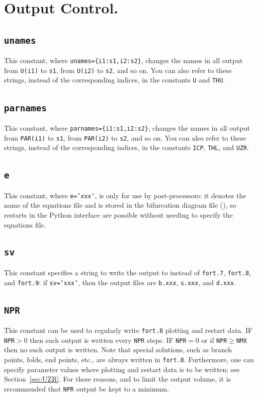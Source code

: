 \documentclass[12pt]{report}
\begin{document}
\section{ Output Control.} \label{sec:Output_control}
\subsection{\tt unames}  \label{sec:unames}
This constant, where {\tt unames=\{i1:s1,i2:s2\}}, changes the names in all
output from {\tt U(i1)} to {\tt s1}, from {\tt U(i2)} to {\tt s2}, and so on.
You can also refer to these strings, instead of the corresponding indices,
in the constants \texttt{U} and \texttt{THU}.

\subsection{\tt parnames}  \label{sec:parnames}
This constant, where {\tt parnames=\{i1:s1,i2:s2\}}, changes the names in all
output from {\tt PAR(i1)} to {\tt s1}, from {\tt PAR(i2)} to {\tt s2},
and so on.
You can also refer to these strings, instead of the corresponding indices,
in the constants \texttt{ICP}, \texttt{THL}, and \texttt{UZR}.

\subsection{\tt e}  \label{sec:e}
This constant, where {\tt e='xxx'}, is only for use by post-processors:
it denotes the name of the equations file and is stored
in the bifurcation diagram file (), so restarts in the
Python interface are possible without needing to specify the equations
file.

\subsection{\tt sv} \label{sec:sv}
This constant specifies a string to write the output to instead of
{\tt fort.7}, {\tt fort.8}, and {\tt fort.9}: if {\tt sv='xxx'}, then
the output files are
{\tt b.xxx}, {\tt s.xxx}, and {\tt d.xxx}.

\subsection{\tt NPR}  \label{sec:NPR}
 This constant can be used to regularly write {\tt fort.8} plotting and restart 
 data.  
 IF {\tt NPR}$>$0 then such output is written every {\tt NPR} steps.
 IF {\tt NPR}$=$0 or if {\tt NPR}$\ge${\tt NMX} then no such output is written.
 Note that special solutions, such as branch points, folds, end points, etc., 
 are always written in {\tt fort.8}.
 Furthermore, one can specify parameter values where plotting and restart 
 data is to be written; see Section~\ref{sec:UZR}.
 For these reasons, and to limit the output volume, it is recommended that
 {\tt NPR} output be kept to a minimum.
\end{document}
